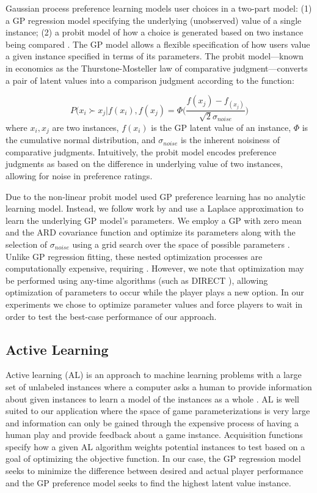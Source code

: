 \documentclass[letterpaper]{article}
\begin{document}
Gaussian process preference learning models user choices in a two-part model: (1) a GP regression model specifying the underlying  (unobserved) value of a single instance; (2) a probit model of how a choice is generated based on two instance being compared \cite{chu2005}. The GP model allows a flexible specification of how users value a given instance specified in terms of its parameters. The probit model---known in economics as the Thurstone-Mosteller law of comparative judgment---converts a pair of latent values into a comparison judgment according to the function:

$$ P( x_i \succ x_j | f(x_i), f(x_j) = \Phi\bigg( \frac{f(x_j) - f_(x_j)}{\sqrt{2} \sigma_{noise}} \bigg) $$
where $x_i, x_j$ are two instances, $f(x_i)$ is the GP latent value of an instance, $\Phi$ is the cumulative normal distribution, and $\sigma_{noise}$ is the inherent noisiness of comparative judgments. Intuitively, the probit model encodes preference judgments as based on the difference in underlying value of two instances, allowing for noise in preference ratings. 

Due to the non-linear probit model used GP preference learning has no analytic learning model. Instead, we follow work by \cite{chu2005} and use a Laplace approximation to learn the underlying GP model's parameters. We employ a GP with zero mean and the ARD covariance function and optimize its parameters along with the selection of $\sigma_{noise}$ using a grid search over the space of possible parameters . Unlike GP regression fitting, these nested optimization processes are computationally expensive, requiring . However, we note that optimization may be performed using any-time algorithms (such as DIRECT ), allowing optimization of parameters to occur while the player plays a new option. In our experiments we chose to optimize parameter values and force players to wait in order to test the best-case performance of our approach.


\subsection{Active Learning}
Active learning (AL) is an approach to machine learning problems with a large set of unlabeled instances where a computer asks a human to provide information about given instances to learn a model of the instances as a whole \cite{settles2012:al-book}. AL is well suited to our application where the space of game parameterizations is very large and information can only be gained through the expensive process of having a human play and provide feedback about a game instance. Acquisition functions specify how a given AL algorithm weights potential instances to test based on a goal of optimizing the objective function. In our case, the GP regression model seeks to minimize the difference between desired and actual player performance and the GP preference model seeks to find the highest latent value instance.
\end{document}
